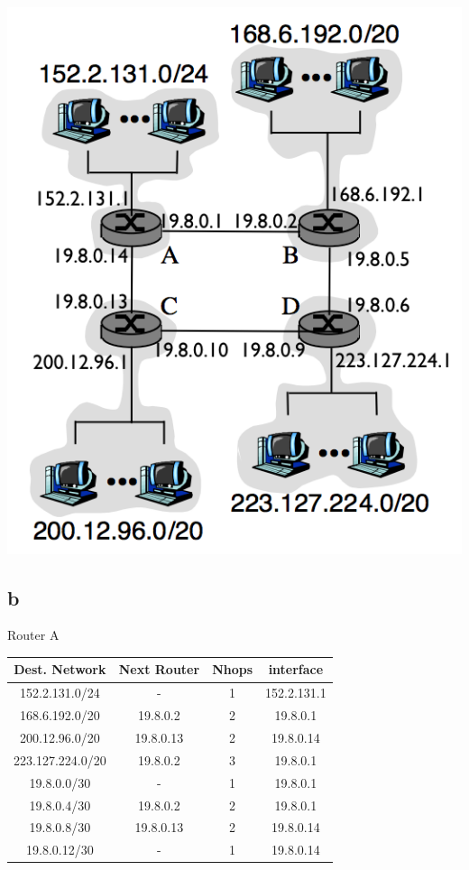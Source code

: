 \documentclass[a4paper, 11pt]{article}
\begin{document}
\begin{multicols}{2}
	\columnbreak
		\includegraphics[scale=0.35]{8001.png}
	\end{multicols}
	
\subsection{b}
	\begin{center}
		Router A \\
		\vspace{2mm}
		
		\begin{tabular}{|c|c|c|c|}
			\hline
			Dest. Network  & Next Router & Nhops & interface\\ 
			\hline
				152.2.131.0/24 & - & 1 & 152.2.131.1\\
				168.6.192.0/20 & 19.8.0.2 & 2 & 19.8.0.1\\ 
				200.12.96.0/20 & 19.8.0.13 & 2 & 19.8.0.14\\ 
				223.127.224.0/20 & 19.8.0.2 & 3 & 19.8.0.1\\ 
				19.8.0.0/30 & - & 1 & 19.8.0.1\\ 
				19.8.0.4/30 & 19.8.0.2 & 2 & 19.8.0.1\\ 
				19.8.0.8/30 & 19.8.0.13 & 2 & 19.8.0.14\\ 
				19.8.0.12/30 & - & 1 & 19.8.0.14 \\
			\hline
		\end{tabular}
	\end{center}
\end{document}
